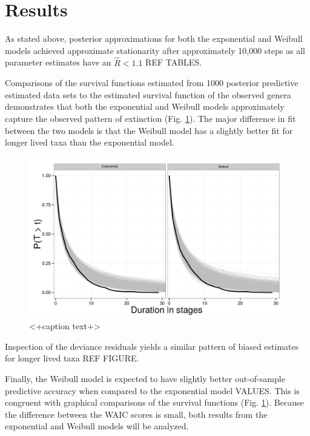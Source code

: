 \documentclass[12pt,letterpaper]{article}
\begin{document}
\section{Results}

As stated above, posterior approximations for both the exponential and Weibull models achieved approximate stationarity after approximately 10,000 steps as all parameter estimates have an \(\hat{R} < 1.1\) \uppercase{ref tables}. 

Comparisons of the survival functions estimated from 1000 posterior predictive estimated data sets to the estimated survival function of the observed genera demonstrates that both the exponential and Weibull models approximately capture the observed pattern of extinction (Fig. \ref{fig:surv}). The major difference in fit between the two models is that the Weibull model has a slightly better fit for longer lived taxa than the exponential model.

\begin{figure}[ht]
  \centering
  \includegraphics[height = 0.5\textheight,width=\textwidth,keepaspectratio=true]{figure/survival_curves}
  \caption{<+caption text+>}
  \label{fig:surv}
\end{figure}

Inspection of the deviance residuals yields a similar pattern of biased estimates for longer lived taxa \uppercase{ref figure}. 

Finally, the Weibull model is expected to have slightly better out-of-sample predictive accuracy when compared to the exponential model \uppercase{values}. This is congruent with graphical comparisons of the survival functions (Fig. \ref{fig:surv}). Because the difference between the WAIC scores is small, both results from the exponential and Weibull models will be analyzed.
\end{document}
